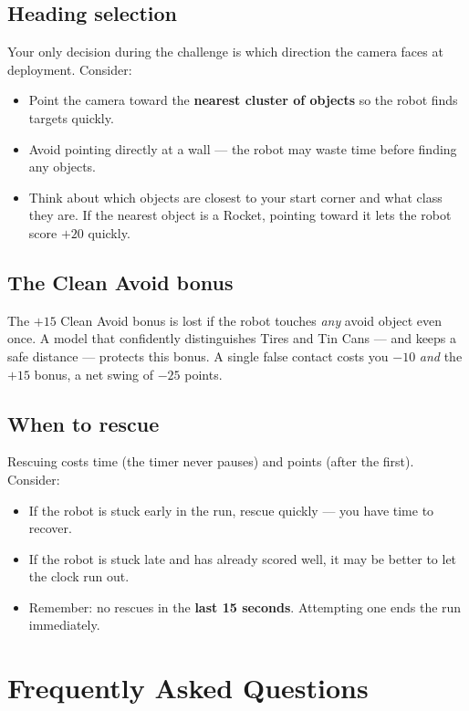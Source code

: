 \documentclass[a4]{article}
\begin{document}
\subsection*{Heading selection}

Your only decision during the challenge is which direction the camera faces at deployment. Consider:
\begin{itemize}
    \item Point the camera toward the \textbf{nearest cluster of objects} so the robot finds targets quickly.
    \item Avoid pointing directly at a wall --- the robot may waste time before finding any objects.
    \item Think about which objects are closest to your start corner and what class they are. If the nearest object is a Rocket, pointing toward it lets the robot score $+20$ quickly.
\end{itemize}

\subsection*{The Clean Avoid bonus}

The $+15$ Clean Avoid bonus is lost if the robot touches \textit{any} avoid object even once. A model that confidently distinguishes Tires and Tin Cans --- and keeps a safe distance --- protects this bonus. A single false contact costs you $-10$ \textit{and} the $+15$ bonus, a net swing of $-25$ points.

\subsection*{When to rescue}

Rescuing costs time (the timer never pauses) and points (after the first). Consider:
\begin{itemize}
    \item If the robot is stuck early in the run, rescue quickly --- you have time to recover.
    \item If the robot is stuck late and has already scored well, it may be better to let the clock run out.
    \item Remember: no rescues in the \textbf{last 15 seconds}. Attempting one ends the run immediately.
\end{itemize}

\pagebreak
\section*{Frequently Asked Questions}
\end{document}
